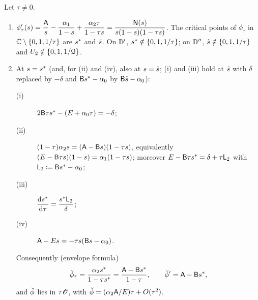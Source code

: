 \begin{lem}
\label{lem:set-N}
Let $\tau\neq0$.
\begin{enumerate}
\item[(a)] $\phi_\tau'(s)=\dfrac{\mathsf{A}}{s}-\dfrac{\alpha_1}{1-s}+\dfrac{\alpha_2\tau}{1-\tau s}=\dfrac{\mathsf{N}(s)}{s(1-s)(1-\tau s)}$. The critical points of $\phi_\tau$ in $\mathbb{C}\setminus\{0,1,1/\tau\}$ are $s^{\ast}$ and $\tilde{s}$. On $\mathbb{D}'$, $s^{\ast}\notin\{0,1,1/\tau\}$; on $\mathbb{D}''$, $\tilde{s}\notin\{0,1,1/\tau\}$ and $U_2\notin\{0,1,1/\mathcal{Q}\}$.
\item[(b)] At $s=s^{\ast}$ (and, for (ii) and (iv), also at $s=\tilde{s}$; (i) and (iii) hold at $\tilde{s}$ with $\delta$ replaced by $-\delta$ and $\mathsf{B}s^{\ast}-\alpha_0$ by $\mathsf{B}\tilde{s}-\alpha_0$):
\begin{description}
\item[(i)] $2\mathsf{B}\tau s^{\ast}-(E+\alpha_0\tau)=-\delta$;
\item[(ii)] $(1-\tau)\alpha_2s=(\mathsf{A}-\mathsf{B} s)(1-\tau s)$, equivalently $(E-\mathsf{B}\tau s)(1-s)=\alpha_1(1-\tau s)$; moreover $E-\mathsf{B}\tau s^{\ast}=\delta+\tau\mathsf{L}_2$ with $\mathsf{L}_2\coloneqq\mathsf{B}s^{\ast}-\alpha_0$;
\item[(iii)] $\dfrac{\mathrm{d}s^{\ast}}{\mathrm{d}\tau}=\dfrac{s^{\ast}\mathsf{L}_2}{\delta}$;
\item[(iv)] $\mathsf{A}-Es=-\tau s(\mathsf{B} s-\alpha_0)$.
\end{description}
Consequently (envelope formula)
\begin{equation}
\label{eq:set-envelope}
\breve{\phi}_\tau=\frac{\alpha_2s^{\ast}}{1-\tau s^{\ast}}=\frac{\mathsf{A}-\mathsf{B}s^{\ast}}{1-\tau},\qquad \breve{\phi}'=\mathsf{A}-\mathsf{B}s^{\ast} ,
\end{equation}
and $\breve{\phi}$ lies in $\tau\mathscr{O}$, with $\breve{\phi}=(\alpha_2\mathsf{A}/E)\tau+O(\tau^2)$.
\end{enumerate}
\end{lem}


